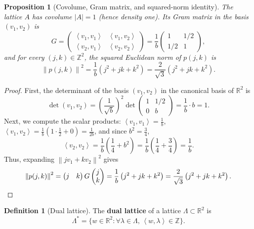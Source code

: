 \documentclass[11pt, a4paper]{article}
\newtheorem{proposition}[theorem]{Proposition}
\theoremstyle{definition}
\newtheorem{definition}[theorem]{Definition}
\theoremstyle{remark}
\newcommand{\R}{\mathbb{R}}
\newcommand{\Z}{\mathbb{Z}}
\newcommand{\norm}[1]{\left\lVert #1 \right\rVert}
\newcommand{\abs}[1]{\left\lvert #1 \right\rvert}
\newcommand{\inner}[2]{\left\langle #1, #2 \right\rangle}
\begin{document}
\begin{proposition}[Covolume, Gram matrix, and squared-norm identity]
\label{prop:gram}
The lattice $A$ has covolume $\abs{A} = 1$ (hence density one). Its Gram matrix in the basis $(v_1, v_2)$ is
\[
G = \begin{pmatrix} \inner{v_1}{v_1} & \inner{v_1}{v_2} \\ \inner{v_2}{v_1} & \inner{v_2}{v_2} \end{pmatrix} = \frac{1}{b} \begin{pmatrix} 1 & 1/2 \\ 1/2 & 1 \end{pmatrix},
\]
and for every $(j, k) \in \Z^2$, the squared Euclidean norm of $p(j, k)$ is
\begin{equation}
\label{eq:norm_sq}
\norm{p(j, k)}^2 = \frac{1}{b}\left(j^2 + j k + k^2\right) = \frac{2}{\sqrt{3}}\left(j^2 + j k + k^2\right).
\end{equation}
\end{proposition}

\begin{proof}
First, the determinant of the basis $(v_1, v_2)$ in the canonical basis of $\R^2$ is
\[
\det(v_1, v_2) = \left(\frac{1}{\sqrt{b}}\right)^2 \det \begin{pmatrix} 1 & 1/2 \\ 0 & b \end{pmatrix} = \frac{1}{b} \cdot b = 1.
\]
Next, we compute the scalar products: $\inner{v_1}{v_1} = \frac{1}{b}$, $\inner{v_1}{v_2} = \frac{1}{b}\left(1 \cdot \frac{1}{2} + 0\right) = \frac{1}{2b}$, and since $b^2 = \frac{3}{4}$,
\[
\inner{v_2}{v_2} = \frac{1}{b}\left(\frac{1}{4} + b^2\right) = \frac{1}{b}\left(\frac{1}{4} + \frac{3}{4}\right) = \frac{1}{b}.
\]
Thus, expanding $\norm{j v_1 + k v_2}^2$ gives
\[
\norm{p(j, k)}^2 = \begin{pmatrix} j & k \end{pmatrix} G \begin{pmatrix} j \\ k \end{pmatrix} = \frac{1}{b}\left(j^2 + j k + k^2\right) = \frac{2}{\sqrt{3}}\left(j^2 + j k + k^2\right). \qedhere
\]
\end{proof}

\begin{definition}[Dual lattice]
The \textbf{dual lattice} of a lattice $\Lambda \subset \R^2$ is
\[
\Lambda^* = \{w \in \R^2 : \forall \lambda \in \Lambda, \, \inner{w}{\lambda} \in \Z\}.
\]
\end{definition}
\end{document}
